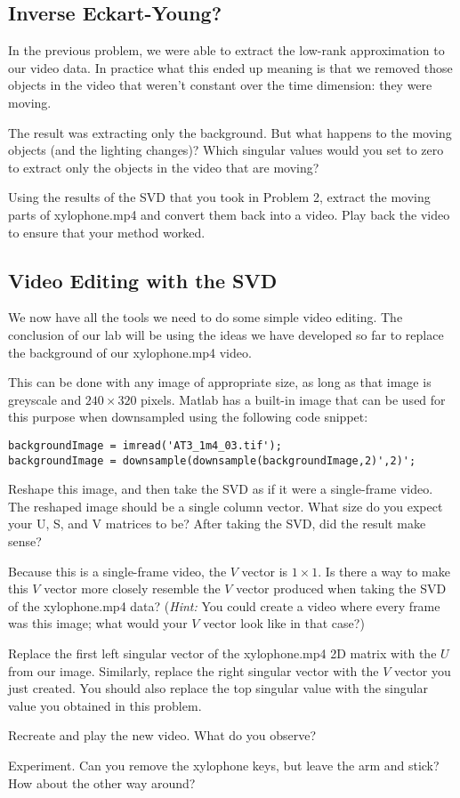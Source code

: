 \subsection{Inverse Eckart-Young?}

In the previous problem, we were able to extract the low-rank approximation to our video data. In practice what this ended up meaning is that we removed those objects in the video that weren't constant over the time dimension: they were moving.

The result was extracting only the background. But what happens to the moving objects (and the lighting changes)? Which singular values would you set to zero to extract only the objects in the video that are moving?

Using the results of the SVD that you took in Problem 2, extract the moving parts of xylophone.mp4 and convert them back into a video. Play back the video to ensure that your method worked.

\subsection{Video Editing with the SVD}

We now have all the tools we need to do some simple video editing. The conclusion of our lab will be using the ideas we have developed so far to replace the background of our xylophone.mp4 video.

This can be done with any image of appropriate size, as long as that image is greyscale and $240\times 320$ pixels. Matlab has a built-in image that can be used for this purpose when downsampled using the following code snippet:

\begin{lstlisting}[style=code]
backgroundImage = imread('AT3_1m4_03.tif');
backgroundImage = downsample(downsample(backgroundImage,2)',2)';
\end{lstlisting}

Reshape this image, and then take the SVD as if it were a single-frame video. The reshaped image should be a single column vector. What size do you expect your U, S, and V matrices to be? After taking the SVD, did the result make sense?

Because this is a single-frame video, the $V$ vector is $1\times 1$. Is there a way to make this $V$ vector more closely resemble the $V$ vector produced when taking the SVD of the xylophone.mp4 data?
(\textit{Hint:}  You could create a video where every frame was this image; what would your $V$ vector look like in that case?)

Replace the first left singular vector of the xylophone.mp4 2D matrix with the $U$ from our image. Similarly, replace the right singular vector with the $V$ vector you just created. You should also replace the top singular value with the singular value you obtained in this problem.

Recreate and play the new video. What do you observe?

Experiment. Can you remove the xylophone keys, but leave the arm and stick? How about the other way around?



